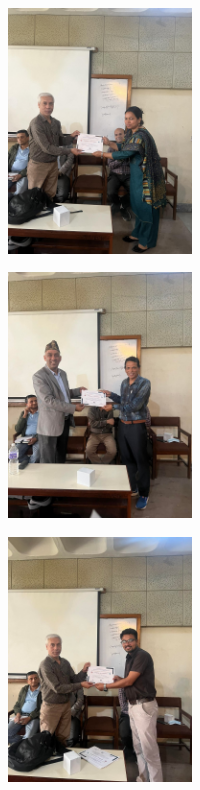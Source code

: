 \documentclass[a4paper,12pt]{report}
\begin{document}
\begin{figure}[h!]
\centering
\begin{subfigure}{0.32\textwidth}
  \includegraphics[height=6.5cm, width=\textwidth]{dhanamaam.jpg}
\end{subfigure}
\hfill
\begin{subfigure}{0.31\textwidth}
  \includegraphics[height=6.5cm, width=\textwidth]{chudamani.jpg}
\end{subfigure}
\hfill
\begin{subfigure}{0.32\textwidth}
  \includegraphics[height=6.5cm, width=\textwidth]{tara.jpg}
\end{subfigure}
\end{figure}
\end{document}

